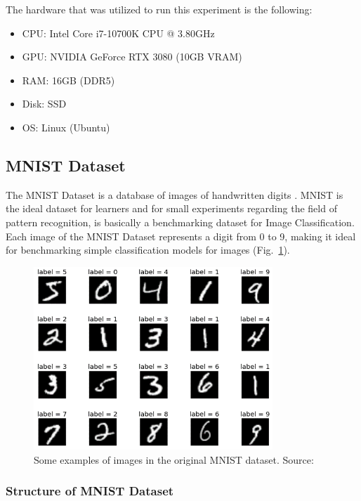 The hardware that was utilized to run this experiment is the following:
\begin{itemize}[itemsep=0.1cm]
	\item CPU: Intel Core i7-10700K CPU @ 3.80GHz
	\item GPU: NVIDIA GeForce RTX 3080 (10GB VRAM)
	\item RAM: 16GB (DDR5)
	\item Disk: SSD
	\item OS: Linux (Ubuntu)
\end{itemize}

\subsection{MNIST Dataset}

The MNIST Dataset is a database of images of handwritten digits \cite{MNIST}.
MNIST is the ideal dataset for learners and for small experiments regarding the field of pattern recognition, is basically a benchmarking dataset for Image Classification.
\\[0.3cm]Each image of the MNIST Dataset represents a digit from 0 to 9, making it ideal for benchmarking simple classification models for images (Fig.~\ref{fig:figure-4.1.3}).
\begin{figure}[t]
	\centering
	\includegraphics[width=9cm]{figures/figure-4.1.3.png}
	\caption[Examples of MNIST Images]{Some examples of images in the original MNIST dataset. Source:~\cite{MNIST}}
	\label{fig:figure-4.1.3}
\end{figure}

\subsubsection{Structure of MNIST Dataset}

